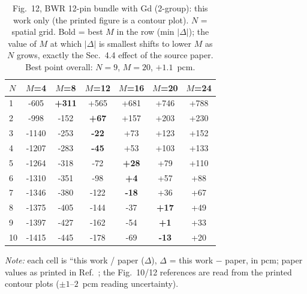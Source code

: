 \begin{landscape}
\begin{table}[h]
\centering
\caption{Fig.~12, BWR 12-pin bundle with Gd (2-group): this work only (the printed figure is a contour plot). $N$ = spatial grid. Bold = best $M$ in the row (min $|\Delta|$); the value of $M$ at which
$|\Delta|$ is smallest shifts to lower $M$ as $N$ grows, exactly the Sec.~4.4 effect of the source paper. Best point overall: $N=9$, $M=20$, $+1.1$~pcm.}
\label{tab:appD}
\footnotesize
\begin{tabular}{lcccccc}
\toprule
\textbf{$N$} & $M$=4 & $M$=8 & $M$=12 & $M$=16 & $M$=20 & $M$=24 \\
\midrule
1 & -605 & \textbf{+311} & +565 & +681 & +746 & +788 \\
2 & -998 & -152 & \textbf{+67} & +157 & +203 & +230 \\
3 & -1140 & -253 & \textbf{-22} & +73 & +123 & +152 \\
4 & -1207 & -283 & \textbf{-45} & +53 & +103 & +133 \\
5 & -1264 & -318 & -72 & \textbf{+28} & +79 & +110 \\
6 & -1310 & -351 & -98 & \textbf{+4} & +57 & +88 \\
7 & -1346 & -380 & -122 & \textbf{-18} & +36 & +67 \\
8 & -1375 & -405 & -144 & -37 & \textbf{+17} & +49 \\
9 & -1397 & -427 & -162 & -54 & \textbf{+1} & +33 \\
10 & -1415 & -445 & -178 & -69 & \textbf{-13} & +20 \\
\bottomrule
\end{tabular}
\par\vspace{2pt}\scriptsize\emph{Note:} each cell is ``this work / paper ($\Delta$), $\Delta$ = this work $-$ paper, in pcm; paper values as printed in Ref.~\cite{psn2027}; the Fig.~10/12 references are read from the printed contour plots ($\pm1$--$2$~pcm reading uncertainty).
\end{table}
\end{landscape}


